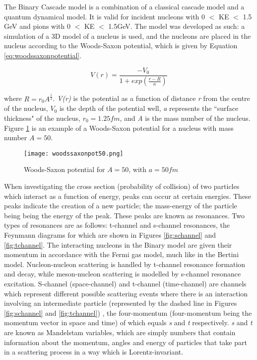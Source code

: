 \documentclass[11pt,oneside,a4paper]{article}
\begin{document}
The Binary Cascade model is a combination of a classical cascade model and a quantum dynamical model. It is valid for incident nucleons with 0 $<$ KE $<$ 1.5 GeV and pions with 0 $<$ KE $<$ 1.5GeV. The model was developed as such: a simulation of a 3D model of a nucleus is used, and the nucleons are placed in the nucleus according to the Woods-Saxon potential, which is given by Equation \ref{eq:woodssaxonpotential}.

\begin{equation}
\label{eq:woodssaxonpotential}
V(r) = \frac{-V_0}{1+exp(\frac{r-R}{a})}
\end{equation}

where $R = r_0A^\frac{1}{3}$. \textit{V(r)} is the potential as a function of distance \textit{r} from the centre of the nucleus, \textit{${V_0}$} is the depth of the potential well, \textit{a} represents the ``surface thickness" of the nucleus, $\textit{${r_0}$}=1.25fm$, and \textit{A} is the mass number of the nucleus. Figure \ref{fig:wspot} is an example of a Woods-Saxon potential for a nucleus with mass number $\textit{A}=50$.

\begin{figure}[htbp]
	\centering
	\texttt{[image: woodssaxonpot50.png]}
	\caption{Woods-Saxon potential for $\textit{A}=50$, with $\textit{a}=50fm$}
	\label{fig:wspot}
\end{figure}

When investigating the cross section (probability of collision) of two particles which interact as a function of energy, peaks can occur at certain energies. These peaks indicate the creation of a new particle; the mass-energy of the particle being being the energy of the peak. These peaks are known as resonances. Two types of resonances are as follows: t-channel and s-channel resonances, the Feynmann diagrams for which are shown in Figures \ref{fig:schannel} and \ref{fig:tchannel}. The interacting nucleons in the Binary model are given their momentum in accordance with the Fermi gas model, much like in the Bertini model. Nucleon-nucleon scattering is handled by t-channel resonance formation and decay, while meson-nucleon scattering is modelled by s-channel resonance excitation. S-channel (space-channel) and t-channel (time-channel) are channels which represent different possible scattering events where there is an interaction involving an intermediate particle (represented by the dashed line in Figures \ref{fig:schannel} and \ref{fig:tchannel}) , the four-momentum (four-momentum being the momentum vector in space and time) of which equals \textit{s} and \textit{t} respectively. \textit{s} and \textit{t} are known as Mandelstam variables, which are simply numbers that contain information about the momentum, angles and energy of particles that take part in a scattering process in a way which is Lorentz-invariant. 
\end{document}
